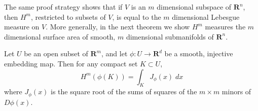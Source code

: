 The same proof strategy shows that if $V$ is an $m$ dimensional subspace of $\mathbf{R}^n$, then $H^m$, restricted to subsets of $V$, is equal to the $m$ dimensional Lebesgue measure on $V$. More generally, in the next theorem we show $H^m$ measures the $m$ dimensional surface area of smooth, $m$ dimensional submanifolds of $\mathbf{R}^n$.

\begin{theorem}
	Let $U$ be an open subset of $\mathbf{R}^m$, and let $\phi: U \to \mathbf{R}^d$ be a smooth, injective embedding map. Then for any compact set $K \subset U$,
	\[ H^m(\phi(K)) = \int_K J_\phi(x)\; dx \]
	where $J_\phi(x)$ is the square root of the sums of squares of the $m \times m$ minors of $D\phi(x)$.
\end{theorem}

\begin{comment}
\begin{proof}
	Let us consider the special case where $K$ is a subset of some closed cube $Q \subset U$. Fix $\varepsilon > 0$. Then consider a $\delta$ small enough that if $x_1,x_2 \in Q$ and $|x_1 - x_2| \leq \delta$, then for each $i \in \{ 1, \dots, d - m \}$ and $j \in \{ 1, \dots, m \}$,
	\[ | \nabla \phi_i(x_1) - \nabla \phi_i(x_2) | \leq d^{-1/2} \varepsilon. \]
	Consider a cover of $K$ by balls $B_{r_1}(x_1), \dots, B_{r_N}(x_N)$, such that $\max(r_1,\dots,r_N) \leq \delta$ and such that
	\[ V_m(r_1^m + \dots + r_N^m) \leq H^s(E) + \varepsilon_1. \]
	The mean value theorem combined with the gradient bounds above implies that for each $i \in \{ 1, \dots, m \}$ and $x \in B_{r_i}(x_i)$,
	\[ |\phi(x) - \phi(x_i) - D\phi(x_i) \cdot (x - x_i)| \leq \varepsilon r_i. \]
	In particular, we conclude that $\phi(B_{r_i}(x_i))$ is contained in a $\varepsilon r_i$ thickening of the set $[D\phi(x_i)](B_{r_i})$. If $D\phi(x_i)$ has positive singular values $s_1, \dots, s_m$, then $J_\phi(x_i) = s_1 \dots s_m$. Since $Q$ is compact, $s_1, \dots, s_m \gtrsim 1$, independant of $x_i$. But this means that
	\[ (s_1 + \varepsilon r_i) \dots + (s_m + \varepsilon_i r_i) = s_1 \dots s_m + O(\varepsilon r_i) = J_\phi(x_i) + O(\varepsilon r_i). \]


	\[ || \]

	$H^m(D(\phi(x_i)(B_{r_i}(x_i)))) = (s_1 + \varepsilon r_i) \dots (s_m + \varepsilon r_i) = J_\phi(x_i) + O(\varepsilon)$.


	then the $\varepsilon r_i$ thickening is the product of an ellipsoid with singular values $(s_1 + \varepsilon r_i), \dots, (s_m + \varepsilon r_i)$ with a ball in $B^{n-m}$ of radius $\varepsilon r_i$.



\end{comment}
